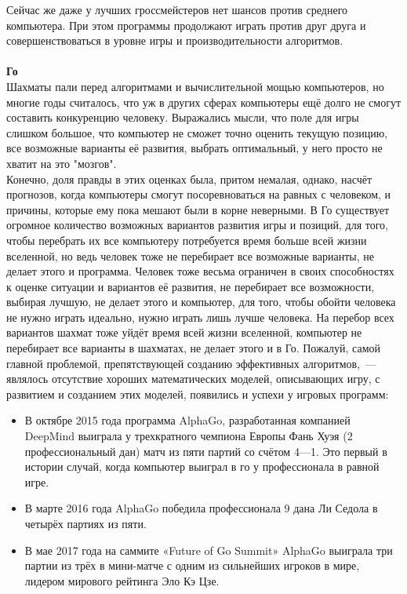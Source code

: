 Сейчас же даже у лучших гроссмейстеров нет шансов против среднего компьютера\cite{chess_human_has_no_chance}. При этом программы продолжают играть против друг друга и совершенствоваться в уровне игры и производительности алгоритмов.\\\\

\textbf{Го}\\
Шахматы пали перед алгоритмами и вычислительной мощью компьютеров, но многие годы считалось, что уж в других сферах компьютеры ещё долго не смогут составить конкуренцию человеку. Выражались мысли, что поле для игры слишком большое, что компьютер не сможет точно оценить текущую позицию, все возможные варианты её развития, выбрать оптимальный, у него просто не хватит на это "мозгов"\cite{go_is_hard}\cite{go_is_hard2}.\\

Конечно, доля правды в этих оценках была, притом немалая, однако, насчёт прогнозов, когда компьютеры смогут посоревноваться на равных с человеком, и причины, которые ему пока мешают были в корне неверными. В Го существует огромное количество возможных вариантов развития игры и позиций, для того, чтобы перебрать их все компьютеру потребуется время больше всей жизни вселенной, но ведь человек тоже не перебирает все возможные варианты, не делает этого и программа. Человек тоже весьма ограничен в своих способностях к оценке ситуации и вариантов её развития, не перебирает все возможности, выбирая лучшую, не делает этого и компьютер, для того, чтобы обойти человека не нужно играть идеально, нужно играть лишь лучше человека. На перебор всех вариантов шахмат тоже уйдёт время всей жизни вселенной, компьютер не перебирает все варианты в шахматах, не делает этого и в Го. Пожалуй, самой главной проблемой, препятствующей созданию эффективных алгоритмов,~--- являлось отсутствие хороших математических моделей, описывающих игру, с развитием и созданием этих моделей, появились и успехи у игровых программ:\\

\begin{itemize}
    \item В октябре 2015 года программа AlphaGo, разработанная компанией DeepMind выиграла у трехкратного чемпиона Европы Фань Хуэя (2 профессиональный дан) матч из пяти партий со счётом 4—1. Это первый в истории случай, когда компьютер выиграл в го у профессионала в равной игре.
    \item В марте 2016 года AlphaGo победила профессионала 9 дана Ли Седола в четырёх партиях из пяти.
    \item В мае 2017 года на саммите «Future of Go Summit» AlphaGo выиграла три партии из трёх в мини-матче с одним из сильнейших игроков в мире, лидером мирового рейтинга Эло Кэ Цзе.\\
\end{itemize}

